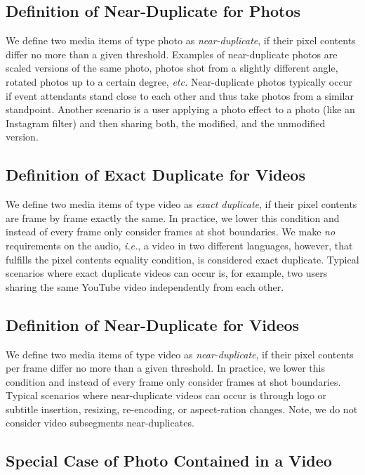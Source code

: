 \subsection{Definition of Near-Duplicate for Photos}

We define two media items of type photo as \emph{near-duplicate},
if their pixel contents differ no more than a given threshold.
Examples of near-duplicate photos are scaled versions
of the same photo, photos shot from a slightly different angle,
rotated photos up to a certain degree, \emph{etc.}
Near-duplicate photos typically occur if event attendants
stand close to each other and thus take photos
from a similar standpoint.
Another scenario is a user applying a photo effect to a photo
(like an Instagram filter) and then sharing both, the modified,
and the unmodified version.

\subsection{Definition of Exact Duplicate for Videos}

We define two media items of type video as \emph{exact duplicate},
if their pixel contents are frame by frame exactly the same.
In practice, we lower this condition and instead of every frame
only consider frames at shot boundaries.
We make \emph{no} requirements on the audio, \emph{i.e.},
a video in two different languages, however, that fulfills the 
pixel contents equality condition, is considered exact duplicate.
Typical scenarios where exact duplicate videos can occur is,
for example, two users sharing the same YouTube video
independently from each other.

\subsection{Definition of Near-Duplicate for Videos}

We define two media items of type video as \emph{near-duplicate},
if their pixel contents per frame differ no more
than a given threshold.
In practice, we lower this condition and instead of every frame
only consider frames at shot boundaries.
Typical scenarios where near-duplicate videos can occur is through
logo or subtitle insertion, resizing, re-encoding,
or aspect-ration changes.
Note, we do not consider video subsegments near-duplicates.

\subsection{Special Case of Photo Contained in a Video}


